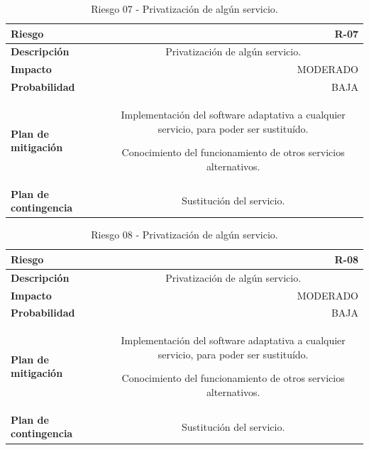         \begin{table}[h!]
        \centering
        \begin{tabular}{|l|c}
        \hline
        \textbf{Riesgo}               & \multicolumn{1}{r|}{R-07}                                             \\ \hline
        \textbf{Descripción}          & \multicolumn{1}{X|}{Privatización de algún servicio.}
        \\ \hline
        \textbf{Impacto}              & \multicolumn{1}{r|}{MODERADO}                                             \\ \hline
        \textbf{Probabilidad}         & \multicolumn{1}{r|}{BAJA}                                         \\ \hline
        \textbf{Plan de mitigación}   & \multicolumn{1}{X|}{ Implementación del software adaptativa a cualquier servicio, para poder ser sustituído.
        
        Conocimiento del funcionamiento de otros servicios alternativos. }
        \\ \hline
        \textbf{Plan de contingencia} & \multicolumn{1}{X|}{ Sustitución del servicio.}
        \\ \hline
        \end{tabular}
        \caption{Riesgo 07 - Privatización de algún servicio. }
        \label{table:riskpriv}
        \end{table}
        \begin{table}[h!]
        \centering
        \begin{tabular}{|l|c}
        \hline
        \textbf{Riesgo}               & \multicolumn{1}{r|}{R-08}                                             \\ \hline
        \textbf{Descripción}          & \multicolumn{1}{X|}{Privatización de algún servicio.}
        \\ \hline
        \textbf{Impacto}              & \multicolumn{1}{r|}{MODERADO}                                             \\ \hline
        \textbf{Probabilidad}         & \multicolumn{1}{r|}{BAJA}                                         \\ \hline
        \textbf{Plan de mitigación}   & \multicolumn{1}{X|}{ Implementación del software adaptativa a cualquier servicio, para poder ser sustituído.
        
        Conocimiento del funcionamiento de otros servicios alternativos. }
        \\ \hline
        \textbf{Plan de contingencia} & \multicolumn{1}{X|}{ Sustitución del servicio.}
        \\ \hline
        \end{tabular}
        \caption{Riesgo 08 - Privatización de algún servicio. }
        \label{table:risk8}
        \end{table}

